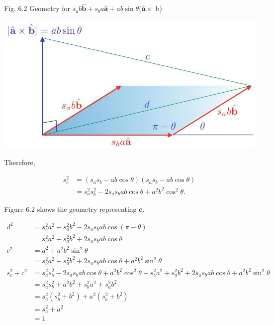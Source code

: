 \documentclass[10pt]{article}
\begin{document}
Fig. 6.2 Geometry for $s_{a} b \hat{\mathbf{b}}+s_{b} a \hat{\mathbf{a}}+a b \sin \theta(\hat{\mathbf{a}} \times$ b)

\begin{center}
\includegraphics[max width=\textwidth]{2023_04_20_41f1ceac5a31dc7d1b59g-104}
\end{center}

Therefore,

$$
\begin{aligned}
s_{c}^{2} & =\left(s_{a} s_{b}-a b \cos \theta\right)\left(s_{a} s_{b}-a b \cos \theta\right) \\
& =s_{a}^{2} s_{b}^{2}-2 s_{a} s_{b} a b \cos \theta+a^{2} b^{2} \cos ^{2} \theta .
\end{aligned}
$$

Figure 6.2 shows the geometry representing $\mathbf{c}$.

$$
\begin{aligned}
d^{2} & =s_{b}^{2} a^{2}+s_{a}^{2} b^{2}-2 s_{a} s_{b} a b \cos (\pi-\theta) \\
& =s_{b}^{2} a^{2}+s_{a}^{2} b^{2}+2 s_{a} s_{b} a b \cos \theta \\
c^{2} & =d^{2}+a^{2} b^{2} \sin ^{2} \theta \\
& =s_{b}^{2} a^{2}+s_{a}^{2} b^{2}+2 s_{a} s_{b} a b \cos \theta+a^{2} b^{2} \sin ^{2} \theta \\
s_{c}^{2}+c^{2} & =s_{a}^{2} s_{b}^{2}-2 s_{a} s_{b} a b \cos \theta+a^{2} b^{2} \cos ^{2} \theta+s_{b}^{2} a^{2}+s_{a}^{2} b^{2}+2 s_{a} s_{b} a b \cos \theta+a^{2} b^{2} \sin ^{2} \theta \\
& =s_{a}^{2} s_{b}^{2}+a^{2} b^{2}+s_{b}^{2} a^{2}+s_{a}^{2} b^{2} \\
& =s_{a}^{2}\left(s_{b}^{2}+b^{2}\right)+a^{2}\left(s_{b}^{2}+b^{2}\right) \\
& =s_{a}^{2}+a^{2} \\
& =1
\end{aligned}
$$
\end{document}
